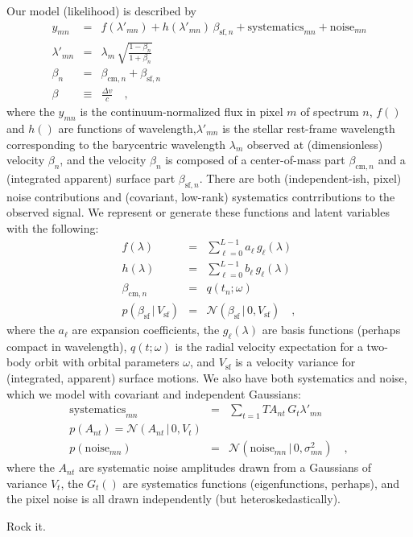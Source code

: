\documentclass[12pt, letterpaper]{article}
\newcommand{\given}{\,|\,}
\newcommand{\normal}{{\mathcal{N}}}
\newcommand{\com}{\mathrm{cm}}
\newcommand{\surf}{\mathrm{sf}}
\begin{document}
Our model (likelihood) is described by
\begin{eqnarray}
  y_{mn} &=& f(\lambda'_{mn}) + h(\lambda'_{mn})\,\beta_{\surf, n} + \mathrm{systematics}_{mn} + \mathrm{noise}_{mn}
  \\
  \lambda'_{mn} &=& \lambda_m\,\sqrt{\frac{1 - \beta_n}{1 + \beta_n}}
  \\
  \beta_n &=& \beta_{\com,n} + \beta_{\surf, n}
  \\
  \beta &\equiv& \frac{\Delta v}{c}
  \quad , 
\end{eqnarray}
where the $y_{mn}$ is the continuum-normalized flux in pixel $m$ of
spectrum $n$, $f()$ and $h()$ are functions of
wavelength,$\lambda'_{mn}$ is the stellar rest-frame wavelength
corresponding to the barycentric wavelength $\lambda_m$ observed at
(dimensionless) velocity $\beta_n$, and the velocity $\beta_n$ is
composed of a center-of-mass part $\beta_{\com,n}$ and a (integrated
apparent) surface part $\beta_{\surf,n}$.
There are both (independent-ish, pixel) noise contributions and
(covariant, low-rank) systematics contrributions to the observed
signal.
We represent or generate these functions and latent variables
with the following:
\begin{eqnarray}
  f(\lambda) &=& \sum_{\ell=0}^{L-1} a_\ell\,g_\ell(\lambda)
  \\
  h(\lambda) &=& \sum_{\ell=0}^{L-1} b_\ell\,g_\ell(\lambda)
  \\
  \beta_{\com,n} &=& q(t_n; \omega)
  \\
  p(\beta_\surf \given V_\surf) &=& \normal(\beta_\surf \given 0, V_\surf)
  \quad ,
\end{eqnarray}
where the $a_\ell$ are expansion coefficients, the $g_\ell(\lambda)$
are basis functions (perhaps compact in wavelength), $q(t;\omega)$ is
the radial velocity expectation for a two-body orbit with orbital
parameters $\omega$, and $V_\surf$ is a velocity variance for
(integrated, apparent) surface motions.
We also have both systematics and noise, which we model with covariant
and independent Gaussians:
\begin{eqnarray}
  \mathrm{systematics}_{mn} &=& \sum_{t=1}{T} A_{nt}\,G_t{\lambda'_{mn}}
  \\
  p(A_{nt}) = \normal(A_{nt}\given 0,V_t)
  \\
  p(\mathrm{noise}_{mn}) &=& \normal(\mathrm{noise}_{mn}\given 0,\sigma_{mn}^2)
  \quad ,
\end{eqnarray}
where the $A_{nt}$ are systematic noise amplitudes drawn from a
Gaussians of variance $V_t$, the $G_{t}()$ are systematics functions
(eigenfunctions, perhaps), and the pixel noise is all drawn
independently (but heteroskedastically).

Rock it.
\end{document}
